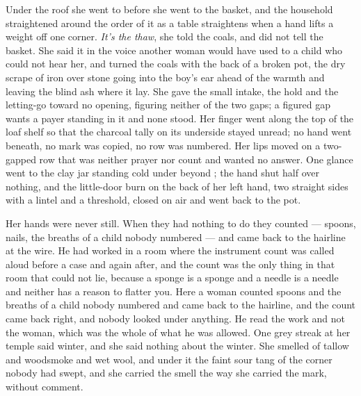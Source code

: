 Under the roof she went to  before she went to the basket, and the household straightened around the order of it as a table straightens when a hand lifts a weight off one corner. \emph{It's the thaw}, she told the coals, and did not tell the basket. She said it in the voice another woman would have used to a child who could not hear her, and turned the coals with the back of a broken pot, the dry scrape of iron over stone going into the boy's ear ahead of the warmth and leaving the blind ash where it lay. She gave the small intake, the hold and the letting-go toward no opening, figuring neither of the two gaps; a figured gap wants a payer standing in it and none stood. Her finger went along the top of the loaf shelf so that the charcoal tally on its underside stayed unread; no hand went beneath, no mark was copied, no row was numbered. Her lips moved on a two-gapped row that was neither prayer nor count and wanted no answer. One glance went to the clay jar standing cold under  beyond ; the hand shut half over nothing, and the little-door burn on the back of her left hand, two straight sides with a lintel and a threshold, closed on air and went back to the pot.

Her hands were never still. When they had nothing to do they counted --- spoons, nails, the breaths of a child nobody numbered --- and came back to the hairline at the wire. He had worked in a room where the instrument count was called aloud before a case and again after, and the count was the only thing in that room that could not lie, because a sponge is a sponge and a needle is a needle and neither has a reason to flatter you. Here a woman counted spoons and the breaths of a child nobody numbered and came back to the hairline, and the count came back right, and nobody looked under anything. He read the work and not the woman, which was the whole of what he was allowed. One grey streak at her temple said winter, and she said nothing about the winter. She smelled of tallow and woodsmoke and wet wool, and under it the faint sour tang of the corner nobody had swept, and she carried the smell the way she carried the mark, without comment.

